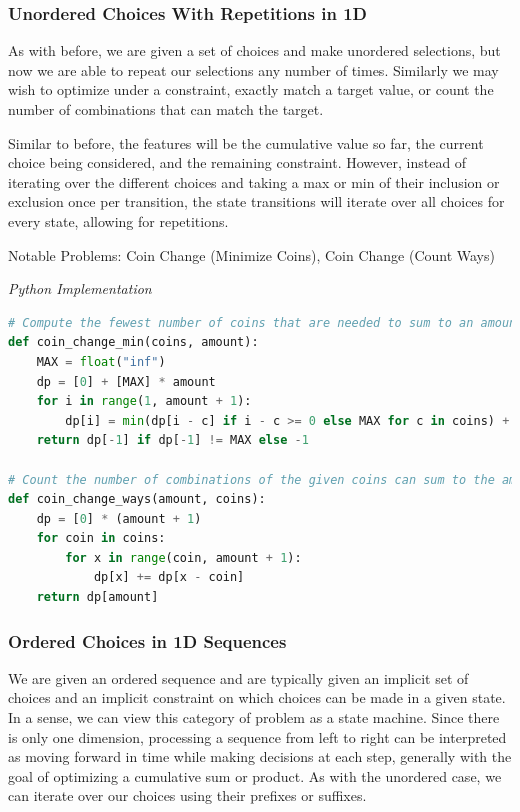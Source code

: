 \documentclass{article}
\newcommand{\comment}[1]{}
\begin{document}
\subsubsection*{Unordered Choices With Repetitions in 1D}
As with before, we are given a set of choices and make unordered selections, but now we are able to repeat our selections any number of times. Similarly we may wish to optimize under a constraint, exactly match a target value, or count the number of combinations that can match the target.

Similar to before, the features will be the cumulative value so far, the current choice being considered, and the remaining constraint. However, instead of iterating over the different choices and taking a max or min of their inclusion or exclusion once per transition, the state transitions will iterate over all choices for every state, allowing for repetitions.

Notable Problems: Coin Change (Minimize Coins), Coin Change (Count Ways)

\vspace{8pt} \emph{Python Implementation}
\begin{lstlisting}[language=Python]
# Compute the fewest number of coins that are needed to sum to an amount
def coin_change_min(coins, amount):
    MAX = float("inf")
    dp = [0] + [MAX] * amount
    for i in range(1, amount + 1):
        dp[i] = min(dp[i - c] if i - c >= 0 else MAX for c in coins) + 1 
    return dp[-1] if dp[-1] != MAX else -1
    
# Count the number of combinations of the given coins can sum to the amount
def coin_change_ways(amount, coins):
    dp = [0] * (amount + 1)
    for coin in coins:
        for x in range(coin, amount + 1):
            dp[x] += dp[x - coin]
    return dp[amount]
\end{lstlisting}

\subsubsection*{Ordered Choices in 1D Sequences}

\comment{
- sliding window with state (?)

for state1 in all values of state1:
    for state2 in in all values of state2:
        for ...
            dp[state1][state2][...] = best_choice(choice1, choice2, ...)
}

We are given an ordered sequence and are typically given an implicit set of choices and an implicit constraint on which choices can be made in a given state. In a sense, we can view this category of problem as a state machine. Since there is only one dimension, processing a sequence from left to right can be interpreted as moving forward in time while making decisions at each step, generally with the goal of optimizing a cumulative sum or product. As with the unordered case, we can iterate over our choices using their prefixes or suffixes.
\end{document}
